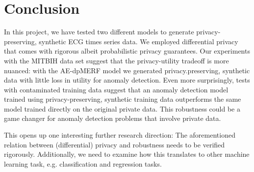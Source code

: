 \section{Conclusion}

In this project, we have tested two different models to generate privacy-preserving, synthetic ECG times series data. We employed differential privacy that comes with rigorous albeit probabilistic privacy guarantees. Our experiments with the MITBIH data set suggest that the privacy-utility tradeoff is more nuanced: with the AE-dpMERF model we generated privacy.preserving, synthetic data with little loss in utility for anomaly detection. Even more surprisingly, tests with contaminated training data suggest that an anomaly detection model trained using privacy-preserving, synthetic training data outperforms the same model trained directly on the original private data. This robustness could be a game changer for anomaly detection problems that involve private data. 

This opens up one interesting further research direction: The aforementioned relation between (differential) privacy and robustness needs to be verified rigorously. Additionally, we need to examine how this translates to other machine learning task, e.g. classification and regression tasks. 
